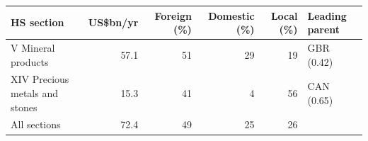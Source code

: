 \begin{tabular}{@{}p{7.2cm} r r r r l@{}}
\toprule
HS section & US\$bn/yr & Foreign (\%) & Domestic (\%) & Local (\%) & Leading parent \\
\midrule
V Mineral products & 57.1 & 51 & 29 & 19 & GBR (0.42) \\
XIV Precious metals and stones & 15.3 & 41 & 4 & 56 & CAN (0.65) \\
\midrule
All sections & 72.4 & 49 & 25 & 26 & \\
\bottomrule
\end{tabular}
